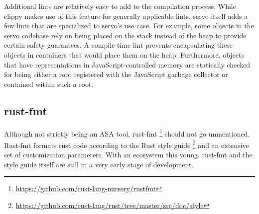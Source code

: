 \documentclass{scrartcl}
\begin{document}
Additional lints are relatively easy to add to the compilation process. While clippy makes use of this feature for generally applicable lints, servo itself adds a few lints that are specialized to servo's use case. For example, some objects in the servo codebase rely on being placed on the stack instead of the heap to provide certain safety guarantees. A compile-time lint prevents encapsulating these objects in containers that would place them on the heap. Furthermore, objects that have representations in JavaScript-controlled memory are statically checked for being either a root registered with the JavaScript garbage collector or contained within such a root.

\subsection{rust-fmt}
Although not strictly being an ASA tool, rust-fmt \footnote{\url{https://github.com/rust-lang-nursery/rustfmt}} should not go unmentioned. Rust-fmt formats rust code according to the Rust style guide \footnote{\url{https://github.com/rust-lang/rust/tree/master/src/doc/style}} and an extensive set of customization parameters. With an ecosystem this young, rust-fmt and the style guide itself are still in a very early stage of development.
\end{document}
